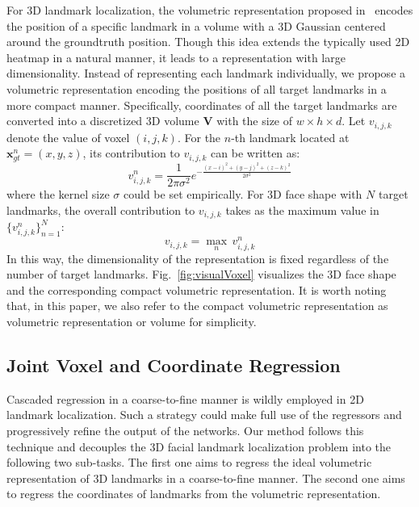 \documentclass[a4paper,conference]{IEEEtran}
\begin{document}
For 3D landmark localization, the volumetric representation proposed in~\cite{pavlakos2017coarse} encodes the position of a specific landmark in a volume with a 3D Gaussian centered around the groundtruth position. 
Though this idea extends the typically used 2D heatmap in a natural manner, it leads to a representation with large dimensionality.
Instead of representing each landmark individually, we propose a volumetric representation encoding the positions of all target landmarks in a more compact manner.
Specifically, coordinates of all the target landmarks are converted into a discretized 3D volume $\mathbf{V}$ with the size of $w\times h\times d$. 
Let $v_{i,j,k}$ denote the value of voxel $(i,j,k)$.
For the $n$-th landmark located at $\bm{x}_{gt}^{n}=(x,y,z)$, its contribution to $v_{i,j,k}$ can be written as:
\begin{equation}
\label{eq:voxel}
{v}_{i,j,k}^{n}=\frac{1}{2\pi {{\sigma }^{2}}}{{e}^{-\frac{{{(x-i)}^{2}}+{{(y-j)}^{2}}+{{(z-k)}^{2}}}{2{{\sigma }^{2}}}}}
\end{equation}
where the kernel size $\sigma$ could be set empirically.
For 3D face shape with $N$ target landmarks, the overall contribution to $v_{i,j,k}$ takes as the maximum value in $\{{v}_{i,j,k}^{n}\}_{n=1}^N$:
\begin{equation}
{v}_{i,j,k}=\underset{n}{\mathop{\max }}\,v_{i,j,k}^{n}
\end{equation}
In this way, the dimensionality of the representation is fixed regardless of the number of target landmarks. 
Fig.~\ref{fig:visualVoxel} visualizes the 3D face shape and the corresponding compact volumetric representation.
It is worth noting that, in this paper, we also refer to the compact volumetric representation as volumetric representation or volume for simplicity.



\subsection{Joint Voxel and Coordinate Regression}

Cascaded regression in a coarse-to-fine manner is wildly employed in 2D landmark localization.
Such a strategy could make full use of the regressors and progressively refine the output of the networks.
Our method follows this technique and decouples the 3D facial landmark localization problem into the following two sub-tasks.
The first one aims to regress the ideal volumetric representation of 3D landmarks in a coarse-to-fine manner.
The second one aims to regress the coordinates of landmarks from the volumetric representation.
\end{document}
